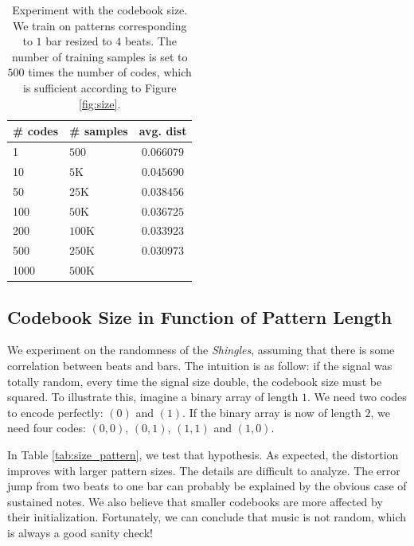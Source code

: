 \documentclass{article}
\begin{document}
\begin{table}
\begin{center}
\begin{tabular}{|l|l|c|}
\hline
\# codes & \# samples & avg. dist \\ \hline \hline
1 & $500$ & $0.066079$ \\
10 & $5$K & $0.045690$ \\
50 & $25$K & $0.038456$ \\
100 & $50$K & $0.036725$ \\
200 & $100$K & $0.033923$ \\
500 & $250$K & $0.030973$ \\
1000 & $500$K & \\ \hline
\end{tabular}
\end{center}
\caption{{Experiment with the codebook size. We train on patterns
corresponding to $1$ bar resized to $4$ beats. The number of training
samples is set to $500$ times the number of codes, which is sufficient
according to Figure \ref{fig:size}.}}
\label{tab:cbsize}
\end{table}


\subsection{Codebook Size in Function of Pattern Length}
We experiment on the randomness of the \textit{Shingles}, assuming
that there is some correlation between beats and bars.
The intuition is as follow: if the signal was totally random, every
time the signal size double, the codebook size must be squared.
To illustrate this, imagine a binary array of length $1$. We need two
codes to encode perfectly: $(0)$ and $(1)$. If the binary array is now of
length $2$, we need four codes: $(0,0)$, $(0,1)$, $(1,1)$ and $(1,0)$.

In Table \ref{tab:size_pattern}, we test that hypothesis. As expected,
the distortion improves with larger pattern sizes. The details
are difficult to analyze. The error jump from two beats to one bar
can probably be explained by the obvious case of sustained notes.
We also believe that smaller codebooks are more affected by their
initialization. Fortunately, we can conclude that music is not random,
which is always a good sanity check!
\end{document}

